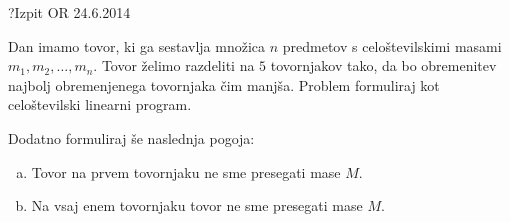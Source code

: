 \begin{naloga}{?}{Izpit OR 24.6.2014}
\begin{vprasanje}
Dan imamo tovor,
ki ga sestavlja množica $n$ predmetov
s celoštevilskimi masami $m_1, m_2, \dots, m_n$.
Tovor želimo razdeliti na $5$ tovornjakov tako,
da bo obremenitev najbolj obremenjenega tovornjaka čim manjša.
Problem formuliraj kot celoštevilski linearni program.

Dodatno formuliraj še naslednja pogoja:
\begin{enumerate}[(a)]
\item Tovor na prvem tovornjaku ne sme presegati mase $M$.
\item Na vsaj enem tovornjaku tovor ne sme presegati mase $M$.
\end{enumerate}
\end{vprasanje}
\begin{odgovor}
\end{odgovor}
\end{naloga}
